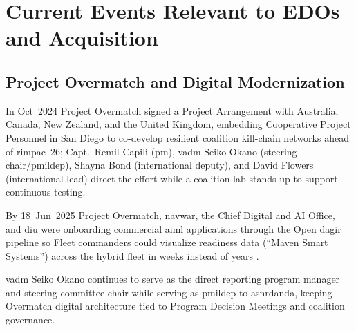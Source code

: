 \documentclass[../main.tex]{subfiles}
\begin{document}

\section{Current Events Relevant to EDOs and Acquisition}

\subsection{Project Overmatch and Digital Modernization}
\begin{description}[style=nextline,labelsep=0.5em,font=\bfseries]
  \item[\textbf{Five Eyes Project Arrangement.}] In Oct~2024 Project Overmatch signed a Project Arrangement with Australia, Canada, New Zealand, and the United Kingdom, embedding Cooperative Project Personnel in San Diego to co-develop resilient coalition kill-chain networks ahead of \ac{rimpac}~26; Capt.\ Remil Capili (\ac{pm}), \ac{vadm} Seiko Okano (steering chair/\ac{pmildep}), Shayna Bond (international deputy), and David Flowers (international lead) direct the effort while a coalition lab stands up to support continuous testing\autocite{DVIDS-Overmatch-FVEY-2025-Nov}.
  \item[\textbf{Open \ac{dagir} pilot.}] By 18~Jun~2025 Project Overmatch, \ac{navwar}, the Chief Digital and AI Office, and \ac{diu} were onboarding commercial \ac{aiml} applications through the Open \ac{dagir} pipeline so Fleet commanders could visualize readiness data (``Maven Smart Systems'') across the hybrid fleet in weeks instead of years \autocite{DVIDS-Overmatch-OpenDAGIR-2025}.
  \item[\textbf{Leadership signal.}] \ac{vadm} Seiko Okano continues to serve as the direct reporting program manager and steering committee chair while serving as \ac{pmildep} to \ac{asnrdanda}, keeping Overmatch digital architecture tied to Program Decision Meetings and coalition governance\autocite{DVIDS-Overmatch-FVEY-2025-Nov,SECNAV5000-2G}.
\end{description}
\end{document}
